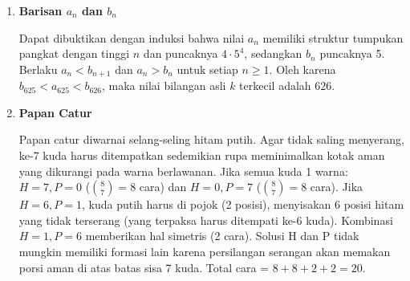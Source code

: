\documentclass[11pt]{article}
\begin{document}
\begin{enumerate}
\begin{center}
    \end{center}
    \vspace{1ex}
    
    \item \textbf{Barisan $a_n$ dan $b_n$}
    
    Dapat dibuktikan dengan induksi bahwa nilai $a_n$ memiliki struktur tumpukan pangkat dengan tinggi $n$ dan puncaknya $4 \cdot 5^4$, sedangkan $b_n$ puncaknya 5. Berlaku $a_n < b_{n+1}$ dan $a_n > b_n$ untuk setiap $n \ge 1$. Oleh karena $b_{625} < a_{625} < b_{626}$, maka nilai bilangan asli $k$ terkecil adalah $626$.
    
    \item \textbf{Papan Catur}
    
    Papan catur diwarnai selang-seling hitam putih. Agar tidak saling menyerang, ke-7 kuda harus ditempatkan sedemikian rupa meminimalkan kotak aman yang dikurangi pada warna berlawanan. Jika semua kuda 1 warna: $H=7, P=0$ ($\binom{8}{7}=8$ cara) dan $H=0, P=7$ ($\binom{8}{7}=8$ cara).
    Jika $H=6, P=1$, kuda putih harus di pojok (2 posisi), menyisakan 6 posisi hitam yang tidak terserang (yang terpaksa harus ditempati ke-6 kuda). Kombinasi $H=1, P=6$ memberikan hal simetris (2 cara). Solusi H dan P tidak mungkin memiliki formasi lain karena persilangan serangan akan memakan porsi aman di atas batas sisa 7 kuda.
    Total cara = $8 + 8 + 2 + 2 = 20$.
    
\end{enumerate}
\end{document}
